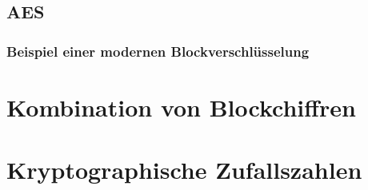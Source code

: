 \subsection{AES}
\subsubsection*{Beispiel einer modernen Blockverschlüsselung}

\section{Kombination von Blockchiffren}

\section{Kryptographische Zufallszahlen}














